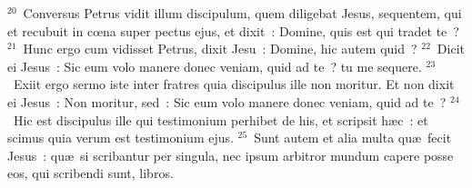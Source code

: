 ${}^{20}$~Conversus Petrus vidit illum discipulum, quem diligebat Jesus, sequentem, qui et recubuit in cœna super pectus ejus, et dixit~: Domine, quis est qui tradet te~?
${}^{21}$~Hunc ergo cum vidisset Petrus, dixit Jesu~: Domine, hic autem quid~?
${}^{22}$~Dicit ei Jesus~: Sic eum volo manere donec veniam, quid ad te~? tu me sequere.
${}^{23}$~Exiit ergo sermo iste inter fratres quia discipulus ille non moritur. Et non dixit ei Jesus~: Non moritur, sed~: Sic eum volo manere donec veniam, quid ad te~?
${}^{24}$~Hic est discipulus ille qui testimonium perhibet de his, et scripsit h\ae c~: et scimus quia verum est testimonium ejus.
${}^{25}$~Sunt autem et alia multa qu\ae\ fecit Jesus~: qu\ae\ si scribantur per singula, nec ipsum arbitror mundum capere posse eos, qui scribendi sunt, libros.
